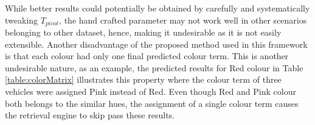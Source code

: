 While better results could potentially be obtained by carefully and systematically tweaking $T_{pivot}$, the hand crafted parameter may not work well in other scenarios belonging to other dataset, hence, making it undesirable as it is not easily extensible. Another disadvantage of the proposed method used in this framework is that each colour had only one final predicted colour term. This is another undesirable nature, as an example, the predicted results for Red colour in Table \ref{table:colorMatrix} illustrates this property where the colour term of three vehicles were assigned Pink instead of Red. Even though Red and Pink colour both belongs to the similar hues, the assignment of a single colour term causes the retrieval engine to skip pass these results.


\begin{table}[!ht]
\centering
\caption{Confusion Matrix for Colour Retrieval Task}
\vspace{1.5em}
\label{table:colorMatrix}
\end{table}
